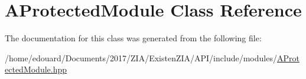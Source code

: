 \hypertarget{classAProtectedModule}{}\section{A\+Protected\+Module Class Reference}
\label{classAProtectedModule}


The documentation for this class was generated from the following file\+:\begin{DoxyCompactItemize}
\item 
/home/edouard/\+Documents/2017/\+Z\+I\+A/\+Existen\+Z\+I\+A/\+A\+P\+I/include/modules/\mbox{\hyperlink{AProtectedModule_8hpp}{A\+Protected\+Module.\+hpp}}\end{DoxyCompactItemize}

